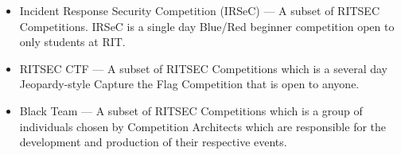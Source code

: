 \begin{itemize}
      \item Incident Response Security Competition (IRSeC) --- A subset of RITSEC
            Competitions. IRSeC is a single day Blue/Red beginner competition open to only
            students at RIT\@.

      \item RITSEC CTF --- A subset of RITSEC Competitions which is a several day
            Jeopardy-style Capture the Flag Competition that is open to anyone.

      \item Black Team --- A subset of RITSEC Competitions which is a group of individuals
            chosen by Competition Architects which are responsible for the development and
            production of their respective events.

\end{itemize}